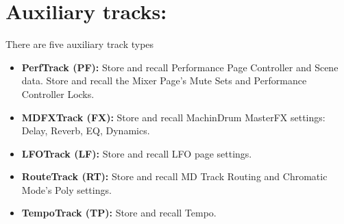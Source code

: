 \section{Auxiliary tracks:}
There are five auxiliary track types
 \begin{itemize}
  \item \textbf{PerfTrack (PF):} Store and recall Performance Page Controller and Scene data. Store and recall the Mixer Page's Mute Sets and Performance Controller Locks.
 \item \textbf{MDFXTrack (FX):} Store and recall MachinDrum MasterFX settings: Delay, Reverb, EQ, Dynamics.
 \item \textbf{LFOTrack (LF):} Store and recall LFO page settings.
 \item \textbf{RouteTrack (RT):} Store and recall MD Track Routing and Chromatic Mode's Poly settings.
 \item \textbf{TempoTrack (TP):} Store and recall Tempo.
\end{itemize}
